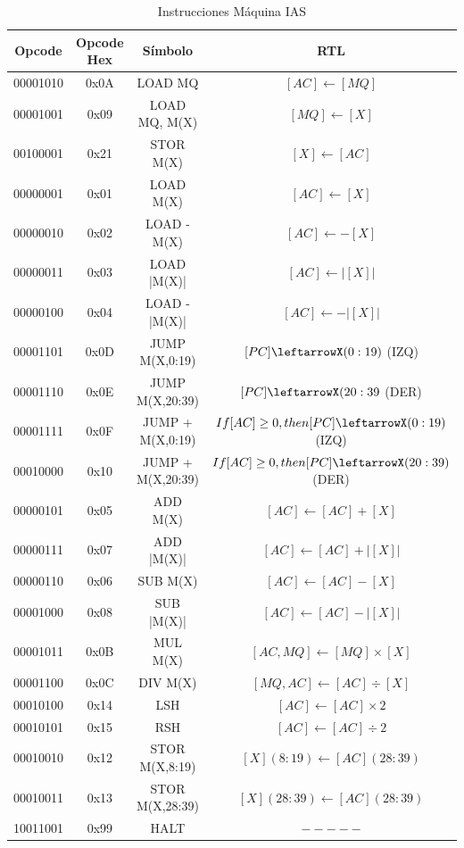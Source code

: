 \documentclass{article}
\begin{document}
\begin{table}[htbp]
  \caption{Instrucciones Máquina IAS}
  \label{tab:tablaISA-IAS}
  \centering
  \begin{tabular}{|cccc|}
    \hline
    Opcode   & Opcode Hex &  Símbolo           & RTL \\ \hline
    00001010 & 0x0A       &  LOAD MQ           & $[AC]\leftarrow[MQ]$\\
    00001001 & 0x09       &  LOAD MQ, M(X)     & $[MQ]\leftarrow[X]$\\
    00100001 & 0x21       &  STOR M(X)         & $[X]\leftarrow[AC]$\\
    00000001 & 0x01       &  LOAD M(X)         & $[AC]\leftarrow[X]$\\
    00000010 & 0x02       &  LOAD -M(X)        & $[AC]\leftarrow-[X]$\\        
    00000011 & 0x03       &  LOAD |M(X)|       & $[AC]\leftarrow|[X]|$\\
    00000100 & 0x04       &  LOAD -|M(X)|      & $[AC]\leftarrow-|[X]|$\\
    00001101 & 0x0D       &  JUMP M(X,0:19)    & $[PC]\leftarrowX(0:19)$ (IZQ)\\
    00001110 & 0x0E       &  JUMP M(X,20:39)   & $[PC]\leftarrowX(20:39$ (DER) \\
    00001111 & 0x0F       &  JUMP + M(X,0:19)  & $If[AC]\geq0,then[PC]\leftarrowX(0:19)$ (IZQ)\\
    00010000 & 0x10       &  JUMP + M(X,20:39) & $If[AC]\geq0,then[PC]\leftarrowX(20:39)$ (DER)\\
    00000101 & 0x05       &  ADD M(X)          & $[AC]\leftarrow[AC]+[X]$ \\
    00000111 & 0x07       &  ADD |M(X)|        & $[AC]\leftarrow[AC]+|[X]|$ \\
    00000110 & 0x06       &  SUB M(X)          & $[AC]\leftarrow[AC]-[X]$ \\
    00001000 & 0x08       &  SUB |M(X)|        & $[AC]\leftarrow[AC]-|[X]|$ \\
    00001011 & 0x0B       &  MUL M(X)          & $[AC,MQ]\leftarrow[MQ]\times[X]$ \\
    00001100 & 0x0C       &  DIV M(X)          & $[MQ,AC]\leftarrow[AC]\div[X]$ \\
    00010100 & 0x14       &  LSH               & $[AC]\leftarrow[AC]\times2$ \\
    00010101 & 0x15       &  RSH               & $[AC]\leftarrow[AC]\div2$ \\
    00010010 & 0x12       &  STOR M(X,8:19)    & $[X](8:19)\leftarrow[AC](28:39)$ \\
    00010011 & 0x13       &  STOR M(X,28:39)   & $[X](28:39)\leftarrow[AC](28:39)$ \\
    10011001 & 0x99       &  HALT              & $-----$ \\
    \hline
  \end{tabular}
\end{table}
\end{document}
